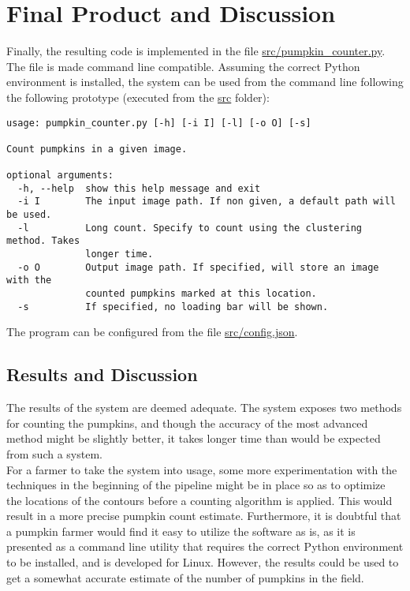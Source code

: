 \documentclass[../Head/Main.tex]{subfiles}
\begin{document}
\section{Final Product and Discussion}
Finally, the resulting code is implemented in the file \url{src/pumpkin_counter.py}. The file is made command line compatible. Assuming the correct Python environment is installed, the system can be used from the command line following the following prototype (executed from the \url{src} folder):
\begin{verbatim}
usage: pumpkin_counter.py [-h] [-i I] [-l] [-o O] [-s]

Count pumpkins in a given image.

optional arguments:
  -h, --help  show this help message and exit
  -i I        The input image path. If non given, a default path will be used.
  -l          Long count. Specify to count using the clustering method. Takes
              longer time.
  -o O        Output image path. If specified, will store an image with the
              counted pumpkins marked at this location.
  -s          If specified, no loading bar will be shown.
\end{verbatim}
The program can be configured from the file \url{src/config.json}.
\subsection{Results and Discussion}
The results of the system are deemed adequate. The system exposes two methods for counting the pumpkins, and though the accuracy of the most advanced method might be slightly better, it takes longer time than would be expected from such a system.\\
For a farmer to take the system into usage, some more experimentation with the techniques in the beginning of the pipeline might be in place so as to optimize the locations of the contours before a counting algorithm is applied. This would result in a more precise pumpkin count estimate. Furthermore, it is doubtful that a pumpkin farmer would find it easy to utilize the software as is, as it is presented as a command line utility that requires the correct Python environment to be installed, and is developed for Linux. However, the results could be used to get a somewhat accurate estimate of the number of pumpkins in the field.
\end{document}
